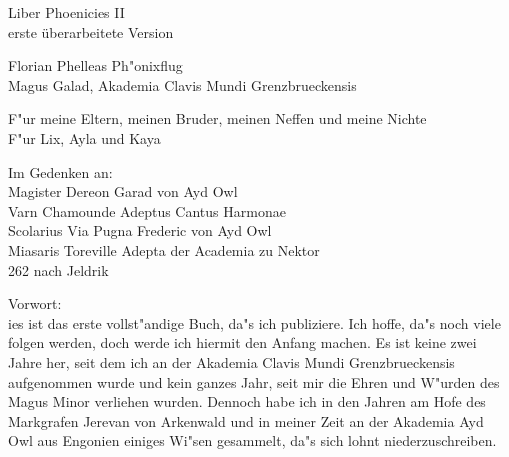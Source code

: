 \documentclass[a5paper,8pt]{book}
\begin{document}
%



\begin{center}
Liber Phoenicies II\\
erste überarbeitete Version\\

\vspace{30mm}

Florian Phelleas Ph"onixflug\\
Magus Galad, Akademia Clavis Mundi Grenzbrueckensis\\

\vspace{10mm}

F"ur meine Eltern, meinen Bruder, meinen Neffen und meine Nichte\\
F"ur Lix, Ayla und Kaya\\

\vspace{10mm}

Im Gedenken an: \\
Magister Dereon Garad von Ayd Owl \\
Varn Chamounde Adeptus Cantus Harmonae \\
Scolarius Via Pugna Frederic von Ayd Owl \\
Miasaris Toreville Adepta der Academia zu Nektor \\
262 nach Jeldrik\\
\end{center}

\newpage

Vorwort: \\
ies ist das erste vollst"andige Buch, da"s ich publiziere. Ich hoffe, da"s noch viele folgen werden, doch werde ich hiermit den Anfang machen. Es ist keine zwei Jahre her, seit dem ich an der Akademia Clavis Mundi Grenzbrueckensis aufgenommen wurde und kein ganzes Jahr, seit mir die Ehren und W"urden des Magus Minor verliehen wurden. Dennoch habe ich in den Jahren am Hofe des Markgrafen Jerevan von Arkenwald und in meiner Zeit an der Akademia Ayd Owl aus Engonien einiges Wi"sen gesammelt, da"s sich lohnt niederzuschreiben.
\end{document}
